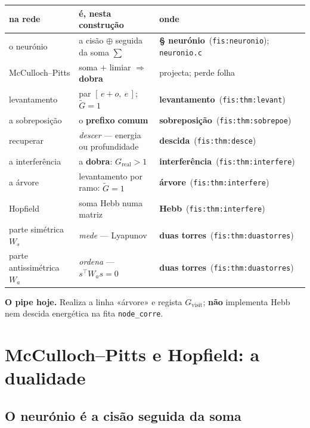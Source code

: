 \documentclass[11pt,a4paper]{article}
\newcommand{\code}[1]{\texttt{\small #1}}
\newcommand{\fis}[2]{\textbf{#2}~\textnormal{(\code{#1})}}
\begin{document}
\begin{center}\footnotesize
\begin{tabular}{@{}>{\raggedright\arraybackslash}p{}>{\raggedright\arraybackslash}p{}>{\raggedright\arraybackslash}p{}@{}}
\toprule
na rede & é, nesta construção & onde \\
\midrule
o neurónio & a cisão $\oplus$ seguida da soma $\sum$ & \fis{fis:neuronio}{§ neurónio}; \code{neuronio.c} \\
McCulloch--Pitts & soma $+$ limiar $\Rightarrow$ \textbf{dobra} & projecta; perde folha \\
levantamento & par $[\,e{+}o,\ e\,]$; $\tilde G=1$ & \fis{fis:thm:levant}{levantamento} \\
a sobreposição & o \textbf{prefixo comum} & \fis{fis:thm:sobrepoe}{sobreposição} \\
recuperar & \emph{descer} --- energia ou profundidade & \fis{fis:thm:desce}{descida} \\
a interferência & a \textbf{dobra}: $G_{\mathrm{real}}>1$ & \fis{fis:thm:interfere}{interferência} \\
a árvore & levantamento por ramo: $\tilde G=1$ & \fis{fis:thm:interfere}{árvore} \\
Hopfield & soma Hebb numa matriz & \fis{fis:thm:interfere}{Hebb} \\
parte simétrica $W_s$ & \emph{mede} --- Lyapunov & \fis{fis:thm:duastorres}{duas torres} \\
parte antissimétrica $W_a$ & \emph{ordena} --- $s^{\!\top}W_as=0$ & \fis{fis:thm:duastorres}{duas torres} \\
\bottomrule
\end{tabular}
\end{center}

\medskip\noindent\textbf{O pipe hoje.} Realiza a linha «árvore» e regista
$G_{\mathrm{visit}}$; \textbf{não} implementa Hebb nem descida energética na fita
\code{node\_corre}.

\section{McCulloch--Pitts e Hopfield: a dualidade}\label{redes:mp-hopfield}

\subsection{O neurónio é a cisão seguida da soma}\label{redes:neuronio}
\end{document}
